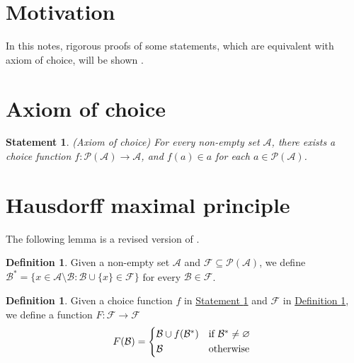 \documentclass{article}
\numberwithin{equation}{section}
\theoremstyle{plain} %
\newtheorem{statement}[equation]{Statement}
\theoremstyle{definition}
\newtheorem{definition}[equation]{Definition}
\theoremstyle{remark}
\begin{document}

\section{Motivation}
In this notes, rigorous proofs of some statements, which are equivalent with axiom of choice, will be shown .  

\section{Axiom of choice}

\begin{statement}
\textup{(Axiom of choice)} \textit{For every non-empty set $\mathcal{A}$, there exists a choice function $f: \mathcal{P} (\mathcal{A}) \to \mathcal{A}$, and $f(a) \in a$ for each $a \in \mathcal{P} (\mathcal{A})$. } \label{statement:Axiom of choice}
\end{statement}

\section{Hausdorff maximal principle}
The following lemma is a revised version of \citep{Spronk.2019}.
\begin{definition}
Given a  non-empty set $\mathcal{A}$ and $\mathcal{F} \subseteq \mathcal{P}(\mathcal{A})$, we define $\mathcal{B}^*=\{x \in \mathcal{A} \setminus \mathcal{B}: \mathcal{B} \cup \{x\} \in  \mathcal{F} \}$ for every $\mathcal{B} \in \mathcal{F}$. \label{definition:F}
\end{definition}

\begin{definition}
Given a choice function $f$ in \hyperref[statement:Axiom of choice]{Statement \ref*{statement:Axiom of choice}} and $\mathcal{F}$ in \hyperref[definition:F]{Definition \ref*{definition:F}}, we define a function $F: \mathcal{F} \to \mathcal{F}$ \label{definition:B_star}
	\begin{equation*}
	    F(\mathcal{B}) =
	    \begin{cases*}
		      \mathcal{B} \cup {f(\mathcal{B}^*)} & if $\mathcal{B}^* \neq  \varnothing$ \\
		     \mathcal{B}       & otherwise
	    \end{cases*}
	 \end{equation*}
\end{definition}
\end{document}
